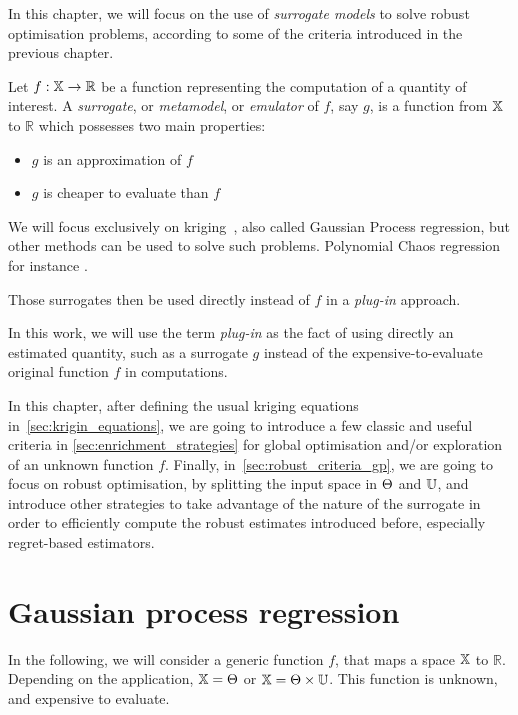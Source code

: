 \documentclass[../../Main_ManuscritThese.tex]{subfiles}
\begin{document}
In this chapter, we will focus on the use of \emph{surrogate models}
to solve robust optimisation problems, according to some of the
criteria introduced in the previous chapter.
\begin{definition}
  Let $f: \mathbb{X} \rightarrow \mathbb{R}$ be a function representing
  the computation of a quantity of interest. A \emph{surrogate}, or
  \emph{metamodel}, or \emph{emulator} of $f$, say $g$, is a function
  from $\mathbb{X}$ to $\mathbb{R}$ which possesses two main properties:
  \begin{itemize}
  \item $g$ is an approximation of $f$
  \item $g$ is cheaper to evaluate than $f$ 
  \end{itemize}
\end{definition}
We will focus exclusively on
kriging~\citep{krige_statistical_1951,matheron_traite_1962}, also
called Gaussian Process regression, but other methods can be used to
solve such problems. Polynomial Chaos regression for instance
\cite{wiener_homogeneous_1938,xiu_wiener--askey_2002,sudret_polynomial_2015,miranda_adjoint-based_2016}. %

Those surrogates then be used directly instead of $f$ in a
\emph{plug-in} approach.

\begin{definition}
  \label{def:plugin}
  In this work, we will use the term \emph{plug-in} as the fact of
  using directly an estimated quantity, such as a surrogate $g$
  instead of the expensive-to-evaluate original function $f$ in
  computations.
\end{definition}

In this chapter, after defining the usual kriging equations
in~\cref{sec:krigin_equations}, we are going to introduce a few
classic and useful criteria in \cref{sec:enrichment_strategies} for
global optimisation and/or exploration of an unknown function
$f$. Finally, in~\cref{sec:robust_criteria_gp}, we are going to focus
on robust optimisation, by splitting the input space in $\Theta$ and
$\mathbb{U}$, and introduce other strategies to take advantage of the
nature of the surrogate in order to efficiently compute the robust
estimates introduced before, especially regret-based estimators.

\section{Gaussian process regression}
In the following, we will consider a generic function $f$, that maps
a space $\mathbb{X}$ to $\mathbb{R}$. Depending on the application,
$\mathbb{X} = \Theta$ or $\mathbb{X} = \Theta \times \mathbb{U}$. This
function is unknown, and expensive to evaluate.
\end{document}
